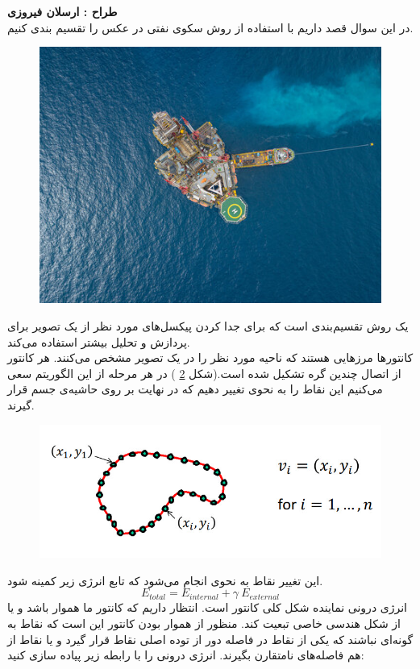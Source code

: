\documentclass[a4paper]{article}
\begin{document}
\section{}
\textbf{طراح :‌ ارسلان فیروزی }
\vspace{0.5cm}
\\
در این سوال قصد داریم با استفاده از روش 
 سکوی نفتی در عکس 
را تقسیم بندی کنیم. 
\begin{figure}[H]
	\centering
	\includegraphics[width=.5\linewidth]{im04}
	\caption{}
	\label{2}
\end{figure}
  یک روش تقسیم‌بندی است که برای جدا کردن پیکسل‌های مورد نظر از یک تصویر برای پردازش و تحلیل بیشتر استفاده می‌کند.
  \\
کانتورها مرزهایی هستند که ناحیه مورد نظر را در یک تصویر مشخص می‌کنند. هر کانتور از اتصال چندین گره تشکیل شده است.(شکل 
\ref{2}
) در هر مرحله‌ از این الگوریتم سعی می‌کنیم این نقاط را به نحوی تغییر دهیم که در نهایت بر روی حاشیه‌ی جسم قرار گیرند. 
\begin{figure}[H]
	\centering
	\includegraphics[width=.5\linewidth]{q3-1}
	\caption{}
	\label{2}
\end{figure}
این تغییر نقاط به نحوی انجام می‌شود که تابع انرژی زیر کمینه شود. 
\begin{equation*}
	E_{total} = E_{internal} + \gamma\ E_{external}
\end{equation*}
انرژی درونی نماینده شکل کلی کانتور است. انتظار داریم که کانتور ما هموار باشد و یا از شکل هندسی خاصی تبعیت کند. منظور از هموار بودن کانتور این است که نقاط به گونه‌ای نباشند که یکی از نقاط در فاصله دور از توده اصلی نقاط قرار گیرد و یا نقاط از هم فاصله‌های نامتقارن بگیرند. انرژی درونی را با رابطه زیر پیاده سازی کنید:
\end{document}
